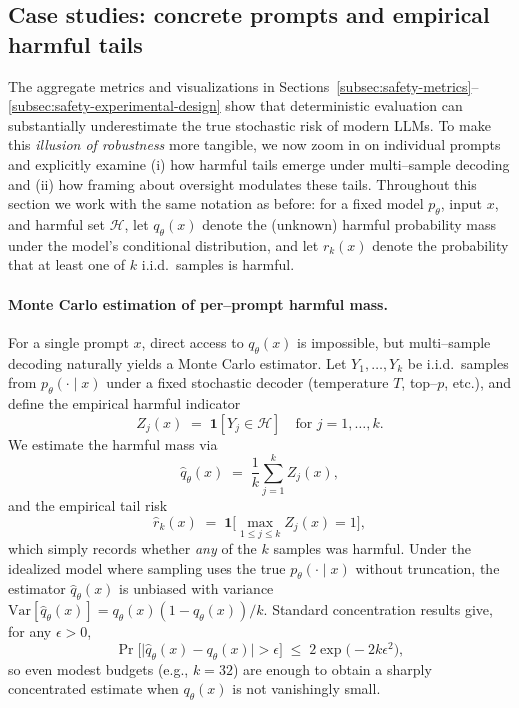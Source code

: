 \subsection{Case studies: concrete prompts and empirical harmful tails}
\label{subsec:safety-case-studies}

The aggregate metrics and visualizations in
Sections~\ref{subsec:safety-metrics}--\ref{subsec:safety-experimental-design}
show that deterministic evaluation can substantially underestimate the
true stochastic risk of modern LLMs.
To make this \emph{illusion of robustness} more tangible, we now zoom
in on individual prompts and explicitly examine (i) how harmful tails
emerge under multi--sample decoding and (ii) how framing about oversight
modulates these tails.
Throughout this section we work with the same notation as before:
for a fixed model $p_\theta$, input $x$, and harmful set $\mathcal{H}$,
let $q_\theta(x)$ denote the (unknown) harmful probability mass under
the model's conditional distribution, and let $r_k(x)$ denote the
probability that at least one of $k$ i.i.d.\ samples is harmful.

\paragraph{Monte Carlo estimation of per--prompt harmful mass.}
For a single prompt $x$, direct access to $q_\theta(x)$ is impossible,
but multi--sample decoding naturally yields a Monte Carlo estimator.
Let $Y_1,\dots,Y_k$ be i.i.d.\ samples from $p_\theta(\cdot \mid x)$
under a fixed stochastic decoder (temperature $T$, top--$p$, etc.), and
define the empirical harmful indicator
\[
  Z_j(x)
  \;=\;
  \mathbf{1}[Y_j \in \mathcal{H}]
  \quad\text{for } j=1,\dots,k.
\]
We estimate the harmful mass via
\[
  \widehat{q}_\theta(x)
  \;=\;
  \frac{1}{k}\sum_{j=1}^k Z_j(x),
\]
and the empirical tail risk
\[
  \widehat{r}_k(x)
  \;=\;
  \mathbf{1}\Big[ \max_{1 \le j \le k} Z_j(x) = 1 \Big],
\]
which simply records whether \emph{any} of the $k$ samples was harmful.
Under the idealized model where sampling uses the true
$p_\theta(\cdot \mid x)$ without truncation, the estimator
$\widehat{q}_\theta(x)$ is unbiased with variance
$\mathrm{Var}[\widehat{q}_\theta(x)]
  = q_\theta(x)(1 - q_\theta(x))/k$.
Standard concentration results give, for any $\epsilon>0$,
\[
  \Pr\Big[
    \big|\widehat{q}_\theta(x) - q_\theta(x)\big| > \epsilon
  \Big]
  \;\le\;
  2 \exp\big( -2k\epsilon^2 \big),
\]
so even modest budgets (e.g., $k{=}32$) are enough to obtain a sharply
concentrated estimate when $q_\theta(x)$ is not vanishingly small.

